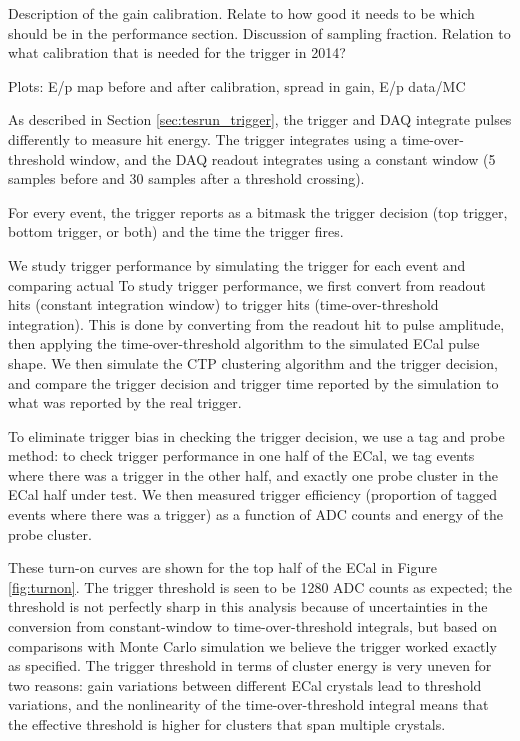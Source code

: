 \vspace{1cm}{\bf ECal Calibration [Sho]}


Description of the gain calibration. Relate to how good it needs to be which should be in the performance section. Discussion of sampling fraction. Relation to what calibration that is needed for the trigger in 2014?

Plots: E/p map before and after calibration, spread in gain, E/p data/MC


\vspace{1cm}{\bf Trigger performance [Sho/Ben]}


As described in Section \ref{sec:tesrun_trigger}, the trigger and DAQ integrate pulses differently to measure hit energy. The trigger integrates using a time-over-threshold window, and the DAQ readout integrates using a constant window (5 samples before and 30 samples after a threshold crossing). 

For every event, the trigger reports as a bitmask the trigger decision (top trigger, bottom trigger, or both) and the time the trigger fires.

We study trigger performance by simulating the trigger for each event and comparing actual To study trigger performance, we first convert from readout hits (constant integration window) to trigger hits (time-over-threshold integration). 
This is done by converting from the readout hit to pulse amplitude, then applying the time-over-threshold algorithm to the simulated ECal pulse shape. 
We then simulate the CTP clustering algorithm and the trigger decision, and compare the trigger decision and trigger time reported by the simulation to what was reported by the real trigger.

To eliminate trigger bias in checking the trigger decision, we use a tag and probe method: to check trigger performance in one half of the ECal, we tag events where there was a trigger in the other half, and exactly one probe cluster in the ECal half under test. 
We then measured trigger efficiency (proportion of tagged events where there was a trigger) as a function of ADC counts and energy of the probe cluster.

These turn-on curves are shown for the top half of the ECal in Figure \ref{fig:turnon}. 
The trigger threshold is seen to be 1280 ADC counts as expected; the threshold is not perfectly sharp in this analysis because of uncertainties in the conversion from constant-window to time-over-threshold integrals, but based on comparisons with Monte Carlo simulation we believe the trigger worked exactly as specified. 
The trigger threshold in terms of cluster energy is very uneven for two reasons: gain variations between different ECal crystals lead to threshold variations, and the nonlinearity of the time-over-threshold integral means that the effective threshold is higher for clusters that span multiple crystals.

